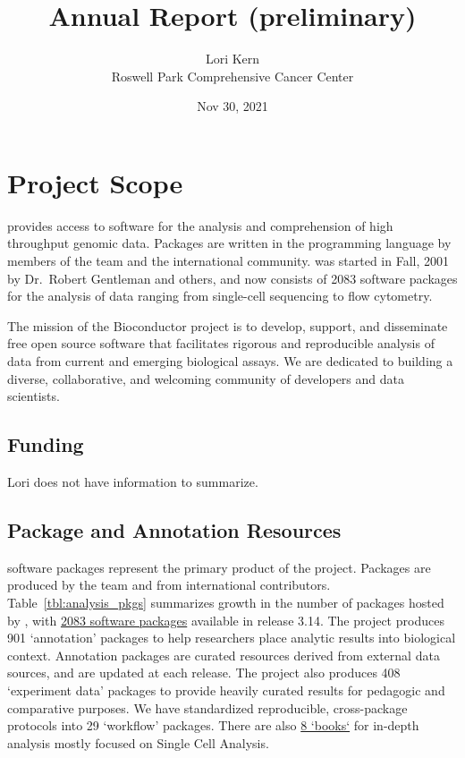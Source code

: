 \documentclass[letterpaper]{article}
\title{\Bioconductor{} Annual Report (preliminary)}
\author{Lori Kern\\ Roswell Park Comprehensive Cancer Center}
\date{Nov 30, 2021}
\begin{document}
\maketitle

\tableofcontents

\section{Project Scope}

\Bioconductor{} provides access to software for the analysis and
comprehension of high throughput genomic data. Packages are written in
the \R{} programming language by members of the \Bioconductor{} team
and the international community. \Bioconductor{} was started in Fall,
2001 by Dr.\ Robert Gentleman and others, and now consists of 2083
software packages for the analysis of data ranging from single-cell
sequencing to flow cytometry.

The mission of the Bioconductor project is to develop, support, and disseminate
free open source software that facilitates rigorous and reproducible analysis of
data from current and emerging biological assays. We are dedicated to building a
diverse, collaborative, and welcoming community of developers and data
scientists.

\subsection{Funding}

Lori does not have information to summarize.

\subsection{Package and Annotation Resources}

\R{} software packages represent the primary product of the
\Bioconductor{} project. Packages are produced by the \Bioconductor{}
team and from international
contributors. Table~\ref{tbl:analysis_pkgs} summarizes growth in the
number of packages hosted by \Bioconductor{}, with
\href{https://bioconductor.org/packages/3.14}{2083 software packages}
available in release 3.14.  The project produces 901 `annotation'
packages to help researchers place analytic results into biological
context. Annotation packages are curated resources derived from
external data sources, and are updated at each release. The project
also produces 408 `experiment data' packages to provide heavily
curated results for pedagogic and comparative purposes. We have
standardized reproducible, cross-package protocols into 29 `workflow'
packages. There are also
\href{http://bioconductor.org/checkResults/3.14/books-LATEST/}{8 `books`} for
in-depth analysis mostly focused on Single Cell Analysis.
\end{document}
